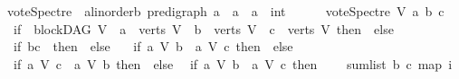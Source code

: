 \begin{isabellebody}
\isanewline
{}\isamarkupfalse%
\ vote{\isacharunderscore}{\kern0pt}Spectre\ {\isacharcolon}{\kern0pt}{\isacharcolon}{\kern0pt}\ {\isachardoublequoteopen}{\isacharparenleft}{\kern0pt}{\isacharprime}{\kern0pt}a{\isacharcolon}{\kern0pt}{\isacharcolon}{\kern0pt}linorder{\isacharcomma}{\kern0pt}{\isacharprime}{\kern0pt}b{\isacharparenright}{\kern0pt}\ pre{\isacharunderscore}{\kern0pt}digraph\ {\isasymRightarrow}{\isacharprime}{\kern0pt}a\ {\isasymRightarrow}\ {\isacharprime}{\kern0pt}a\ {\isasymRightarrow}\ {\isacharprime}{\kern0pt}a\ {\isasymRightarrow}\ int{\isachardoublequoteclose}\ \isanewline
\ \ \isanewline
\ \ {\isachardoublequoteopen}vote{\isacharunderscore}{\kern0pt}Spectre\ V\ a\ b\ c\ {\isacharequal}{\kern0pt}\ {\isacharparenleft}{\kern0pt}\isanewline
\ \ if\ {\isacharparenleft}{\kern0pt}{\isasymnot}\ blockDAG\ V\ {\isasymor}\ a\ {\isasymnotin}\ verts\ V\ {\isasymor}\ b\ {\isasymnotin}\ verts\ V\ {\isasymor}\ c\ {\isasymnotin}\ verts\ V{\isacharparenright}{\kern0pt}\ then\ {}\ else\ \isanewline
\ \ if\ {\isacharparenleft}{\kern0pt}b{\isacharequal}{\kern0pt}c{\isacharparenright}{\kern0pt}\ \ then\ {}\ else\ \isanewline
\ \ if\ {\isacharparenleft}{\kern0pt}{\isacharparenleft}{\kern0pt}a\ {\isasymrightarrow}\isactrlsup {\isacharasterisk}{\kern0pt}\isactrlbsub V\isactrlesub \ b{\isacharparenright}{\kern0pt}\ {\isasymand}\ {\isasymnot}{\isacharparenleft}{\kern0pt}a\ {\isasymrightarrow}\isactrlsup {\isacharplus}{\kern0pt}\isactrlbsub V\isactrlesub \ c{\isacharparenright}{\kern0pt}{\isacharparenright}{\kern0pt}\ then\ {}\ else\isanewline
\ \ if\ {\isacharparenleft}{\kern0pt}{\isacharparenleft}{\kern0pt}a\ {\isasymrightarrow}\isactrlsup {\isacharasterisk}{\kern0pt}\isactrlbsub V\isactrlesub \ c{\isacharparenright}{\kern0pt}\ {\isasymand}\ {\isasymnot}{\isacharparenleft}{\kern0pt}a\ {\isasymrightarrow}\isactrlsup {\isacharplus}{\kern0pt}\isactrlbsub V\isactrlesub \ b{\isacharparenright}{\kern0pt}{\isacharparenright}{\kern0pt}\ then\ {\isacharminus}{\kern0pt}{}\ else\isanewline
\ \ if\ {\isacharparenleft}{\kern0pt}{\isacharparenleft}{\kern0pt}a\ {\isasymrightarrow}\isactrlsup {\isacharplus}{\kern0pt}\isactrlbsub V\isactrlesub \ b{\isacharparenright}{\kern0pt}\ {\isasymand}\ {\isacharparenleft}{\kern0pt}a\ {\isasymrightarrow}\isactrlsup {\isacharplus}{\kern0pt}\isactrlbsub V\isactrlesub \ c{\isacharparenright}{\kern0pt}{\isacharparenright}{\kern0pt}\ then\ \isanewline
\ \ \ {\isacharparenleft}{\kern0pt}sumlist\ b\ c\ {\isacharparenleft}{\kern0pt}map\ {\isacharparenleft}{\kern0pt}{\isasymlambda}i{\isachardot}{\kern0pt}\isanewline

\end{isabellebody}
